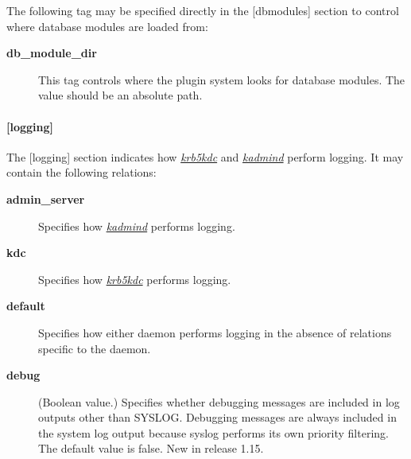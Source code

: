 \documentclass[letterpaper,10pt,english]{sphinxmanual}
\begin{document}
The following tag may be specified directly in the {[}dbmodules{]}
section to control where database modules are loaded from:
\begin{description}
\item[{\textbf{db\_module\_dir}}] \leavevmode
This tag controls where the plugin system looks for database
modules.  The value should be an absolute path.

\end{description}


\paragraph{{[}logging{]}}
\label{admin/conf_files/kdc_conf:id4}\label{admin/conf_files/kdc_conf:logging}
The {[}logging{]} section indicates how {\hyperref[admin/admin_commands/krb5kdc:krb5kdc-8]{\emph{krb5kdc}}} and
{\hyperref[admin/admin_commands/kadmind:kadmind-8]{\emph{kadmind}}} perform logging.  It may contain the following
relations:
\begin{description}
\item[{\textbf{admin\_server}}] \leavevmode
Specifies how {\hyperref[admin/admin_commands/kadmind:kadmind-8]{\emph{kadmind}}} performs logging.

\item[{\textbf{kdc}}] \leavevmode
Specifies how {\hyperref[admin/admin_commands/krb5kdc:krb5kdc-8]{\emph{krb5kdc}}} performs logging.

\item[{\textbf{default}}] \leavevmode
Specifies how either daemon performs logging in the absence of
relations specific to the daemon.

\item[{\textbf{debug}}] \leavevmode
(Boolean value.)  Specifies whether debugging messages are
included in log outputs other than SYSLOG.  Debugging messages are
always included in the system log output because syslog performs
its own priority filtering.  The default value is false.  New in
release 1.15.

\end{description}
\end{document}
